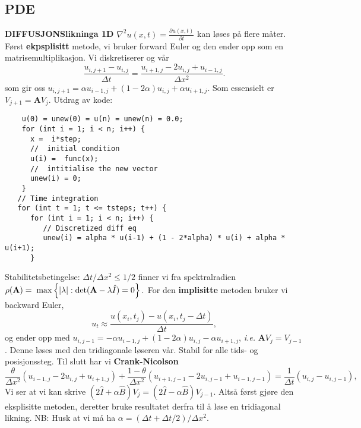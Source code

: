 \documentclass[12pt,a4paper,twocolumn]{article}
\begin{document}
\begin{flushleft}
\subsection{PDE} %
\label{sub:pde}
\textbf{DIFFUSJONSlikninga 1D} $\nabla^2 u(x,t) =\frac{\partial u(x,t)}{\partial t}$ kan løses på flere måter. Først \textbf{ekpsplisitt} metode, vi bruker forward Euler og den ender opp som en matrisemultiplikasjon. Vi diskretiserer og vår
\begin{equation*}
\frac{u_{i,j+1}-u_{i,j}}{\Delta t}=\frac{u_{i+1,j}-2u_{i,j}+u_{i-1,j}}{\Delta x^2}.
\end{equation*}
som gir oss $u_{i,j+1}= \alpha u_{i-1,j}+(1-2\alpha)u_{i,j}+\alpha u_{i+1,j}$. Som essensielt er $V_{j+1} = \mathbf{A}V_{j}$. Utdrag av kode:
\begin{verbatim}
	u(0) = unew(0) = u(n) = unew(n) = 0.0;
    for (int i = 1; i < n; i++) {
      x =  i*step;
      //  initial condition
      u(i) =  func(x);
      //  intitialise the new vector 
      unew(i) = 0;
    }
   // Time integration
   for (int t = 1; t <= tsteps; t++) {
      for (int i = 1; i < n; i++) {
         // Discretized diff eq
         unew(i) = alpha * u(i-1) + (1 - 2*alpha) * u(i) + alpha * u(i+1);
      }
\end{verbatim}
Stabilitetsbetingelse: $\Delta t/\Delta x^2 \le 1/2$ finner vi fra spektralradien $\rho(\mathbf{A}) = \hspace{0.1cm}\mathrm{max}\left\{|\lambda|:\mathrm{det}(\mathbf{A}-\lambda\hat{I})=0\right\}.$ For den \textbf{implisitte} metoden bruker vi backward Euler,
\begin{equation*}
u_t\approx \frac{u(x_i,t_j)-u(x_i,t_j-\Delta t)}{\Delta t},
\end{equation*}
og ender opp med $u_{i,j-1}= -\alpha u_{i-1,j}+(1-2\alpha)u_{i,j}-\alpha u_{i+1,j}$, \emph{i.e.} $\mathbf{A}V_{j} = V_{j-1}$. Denne løses med den tridiagonale løseren vår. Stabil for alle tids- og posisjonssteg. Til slutt har vi \textbf{Crank-Nicolson}
\begin{equation}
\label{eq:cranknicolson}
  \frac{\theta}{\Delta x^2}\left(u_{i-1,j}-2u_{i,j}+u_{i+1,j}\right)+
  \frac{1-\theta}{\Delta x^2}\left(u_{i+1,j-1}-2u_{i,j-1}+u_{i-1,j-1}\right)=
  \frac{1}{\Delta t}\left(u_{i,j}-u_{i,j-1}\right),
\end{equation}
Vi ser at vi kan skrive $\left(2\hat{I}+\alpha\hat{B}\right)V_{j}=\left(2\hat{I}-\alpha\hat{B}\right)V_{j-1}$. Altså først gjøre den eksplisitte metoden, deretter bruke resultatet derfra til å løse en tridiagonal likning. NB: Husk at vi må ha $\alpha = (\Delta t + \Delta t/2) / \Delta x^2$.


\end{flushleft}
\end{document}
